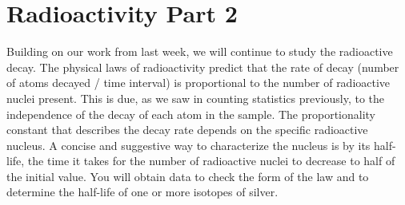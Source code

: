 \chapter{Radioactivity Part 2}



%

Building on our work from last week, we will continue to study the radioactive decay.
The physical laws of radioactivity predict that the rate of decay (number of atoms
decayed / time interval) is proportional to the number of radioactive nuclei present. This
is due, as we saw in counting statistics previously, to the independence of the decay of
each atom in the sample. The proportionality constant that describes the decay rate
depends on the specific radioactive nucleus. A concise and suggestive way to
characterize the nucleus is by its half-life, the time it takes for the number of radioactive
nuclei to decrease to half of the initial value. You will obtain data to check the form of
the law and to determine the half-life of one or more isotopes of silver.

